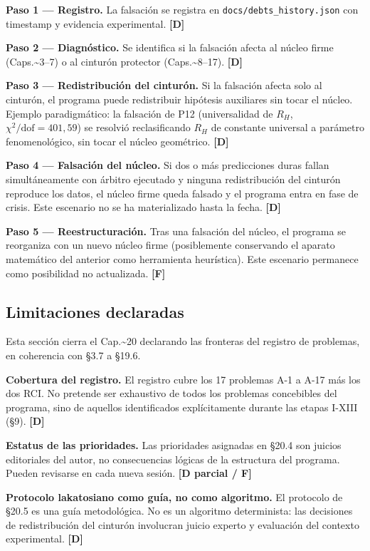﻿\documentclass[11pt,letterpaper]{article}
\begin{document}
\textbf{Paso 1 --- Registro.} La falsación se registra en \texttt{docs/debts\_history.json} con timestamp y evidencia experimental. \textbf{[D]}

\textbf{Paso 2 --- Diagnóstico.} Se identifica si la falsación afecta al núcleo firme (Caps.\textasciitilde{}3--7) o al cinturón protector (Caps.\textasciitilde{}8--17). \textbf{[D]}

\textbf{Paso 3 --- Redistribución del cinturón.} Si la falsación afecta solo al cinturón, el programa puede redistribuir hipótesis auxiliares sin tocar el núcleo. Ejemplo paradigmático: la falsación de P12 (universalidad de $R_H$, $\chi^2/\text{dof} = 401{,}59$) se resolvió reclasificando $R_H$ de constante universal a parámetro fenomenológico, sin tocar el núcleo geométrico. \textbf{[D]}

\textbf{Paso 4 --- Falsación del núcleo.} Si dos o más predicciones duras fallan simultáneamente con árbitro ejecutado y ninguna redistribución del cinturón reproduce los datos, el núcleo firme queda falsado y el programa entra en fase de crisis. Este escenario no se ha materializado hasta la fecha. \textbf{[D]}

\textbf{Paso 5 --- Reestructuración.} Tras una falsación del núcleo, el programa se reorganiza con un nuevo núcleo firme (posiblemente conservando el aparato matemático del anterior como herramienta heurística). Este escenario permanece como posibilidad no actualizada. \textbf{[F]}
\subsection{Limitaciones declaradas}
Esta sección cierra el Cap.\textasciitilde{}20 declarando las fronteras del registro de problemas, en coherencia con §3.7 a §19.6.

\textbf{Cobertura del registro.} El registro cubre los 17 problemas A-1 a A-17 más los dos RCI. No pretende ser exhaustivo de todos los problemas concebibles del programa, sino de aquellos identificados explícitamente durante las etapas I-XIII (§9). \textbf{[D]}

\textbf{Estatus de las prioridades.} Las prioridades asignadas en §20.4 son juicios editoriales del autor, no consecuencias lógicas de la estructura del programa. Pueden revisarse en cada nueva sesión. \textbf{[D parcial / F]}

\textbf{Protocolo lakatosiano como guía, no como algoritmo.} El protocolo de §20.5 es una guía metodológica. No es un algoritmo determinista: las decisiones de redistribución del cinturón involucran juicio experto y evaluación del contexto experimental. \textbf{[D]}
\end{document}
